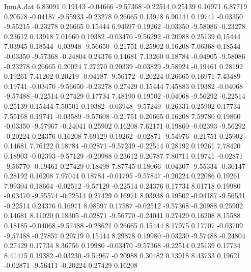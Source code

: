 \begin{filecontents}{ImuA.dat}
   6.83091    0.19143   -0.04666   -9.57368   -0.22514    0.25139    0.16971
   6.87719    0.20578   -0.04187   -9.55933   -0.23278    0.26665    0.13918
   6.90141    0.19741   -0.03350   -9.55215   -0.23278    0.26665    0.15444
   6.94697    0.19262   -0.03350   -9.58086   -0.23278    0.23612    0.13918
   7.01660    0.19382   -0.03470   -9.56292   -0.20988    0.25139    0.15444
   7.03945    0.18544   -0.03948   -9.56650   -0.21751    0.25902    0.16208
   7.06368    0.18544   -0.03350   -9.57368   -0.24804    0.24376    0.14681
   7.13260    0.18784   -0.04905   -9.58086   -0.23278    0.26665    0.20024
   7.27270    0.20339   -0.03829   -9.58924   -0.19461    0.28192    0.19261
   7.41202    0.20219   -0.04187   -9.56172   -0.20224    0.26665    0.16971
   7.43489    0.19741   -0.03470   -9.56650   -0.23278    0.27429    0.15444
   7.45883    0.19382   -0.04068   -9.57488   -0.22514    0.27429    0.17734
   7.48190    0.19502   -0.04068   -9.56292   -0.22514    0.25139    0.15444
   7.50501    0.19382   -0.03948   -9.57249   -0.26331    0.25902    0.17734
   7.55168    0.19741   -0.03589   -9.57608   -0.21751    0.26665    0.16208
   7.59780    0.19860   -0.03350   -9.57967   -0.24041    0.25902    0.16208
   7.62171    0.19860   -0.02393   -9.56292   -0.20224    0.24376    0.16208
   7.69129    0.19262   -0.02871   -9.54976   -0.21751    0.25902    0.14681
   7.76122    0.18784   -0.02871   -9.57249   -0.22514    0.28192    0.19261
   7.78420    0.18903   -0.02393   -9.57129   -0.20988    0.23612    0.20787
   7.80711    0.19741   -0.02871   -9.56770   -0.19461    0.27429    0.18498
   7.87745    0.18066   -0.04307   -9.55334   -0.30147    0.28192    0.16208
   7.97044    0.18784   -0.01795   -9.57847   -0.20224    0.22086    0.19261
   7.99304    0.18664   -0.02512   -9.57129   -0.22514    0.24376    0.17734
   8.01718    0.19980   -0.03470   -9.55574   -0.22514    0.27429    0.16971
   8.03938    0.19502   -0.04187   -9.56531   -0.22514    0.24376    0.16971
   8.08597    0.17587   -0.02512   -9.57368   -0.20988    0.25902    0.14681
   8.11020    0.18305   -0.02871   -9.56770   -0.24041    0.27429    0.16208
   8.15588    0.18185   -0.04068   -9.57488   -0.28621    0.26665    0.15444
   8.17975    0.17707   -0.03709   -9.57488   -0.27857    0.29719    0.15444
   8.29878    0.19980   -0.03230   -9.57488   -0.24804    0.27429    0.17734
   8.36756    0.19980   -0.03470   -9.57368   -0.22514    0.25139    0.17734
   8.41415    0.19382   -0.03230   -9.57967   -0.20988    0.30482    0.13918
   8.43733    0.19621   -0.02871   -9.56411   -0.20224    0.27429    0.16208

\end{filecontents}
